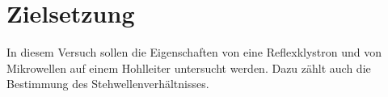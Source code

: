 \section{Zielsetzung}
\label{sec:Zielsetzung}

In diesem Versuch sollen die Eigenschaften von eine Reflexklystron und von Mikrowellen auf einem Hohlleiter untersucht werden. 
Dazu zählt auch die Bestimmung des Stehwellenverhältnisses.
